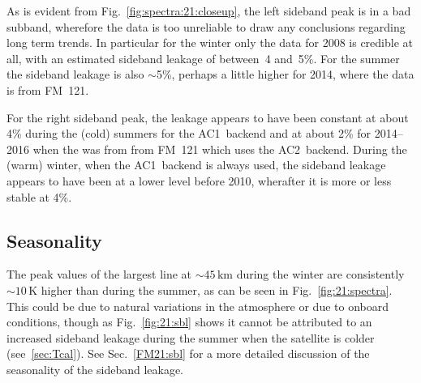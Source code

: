 As is evident from Fig.~\ref{fig:spectra:21:closeup}, the left sideband peak is
in a bad subband, wherefore the data is too unreliable to draw any conclusions
regarding long term trends. In particular for the winter only the data for 2008
is credible at all, with an estimated sideband leakage of between~4 and~5\%.
For the summer the sideband leakage is also $\sim$5\%, perhaps a little higher
for 2014, where the data is from FM~121.

For the right sideband peak, the leakage appears to have been constant at about
4\% during the (cold) summers for the AC1~backend and at about 2\% for
2014--2016 when the was from from FM~121 which uses the AC2~backend.
During the (warm) winter, when the AC1~backend is always used, the  sideband
leakage appears to have been at a lower level before 2010, wherafter it is more
or less stable at 4\%.


\subsection{Seasonality}
\label{FM21:seasonality}
The peak values of the largest  line at $\sim45\,\mathrm{km}$ during the
winter are consistently $\sim10\,\mathrm{K}$ higher than during the summer, as
can be seen in Fig.~\ref{fig:21:spectra}.  This could be due to natural
variations in the atmosphere or due to onboard conditions, though as
Fig.~\ref{fig:21:sbl} shows it cannot be attributed to an increased sideband
leakage during the summer when the satellite is colder (see~\ref{sec:Tcal}).
See Sec.~\ref{FM21:sbl} for a more detailed discussion of the seasonality of
the sideband leakage.
